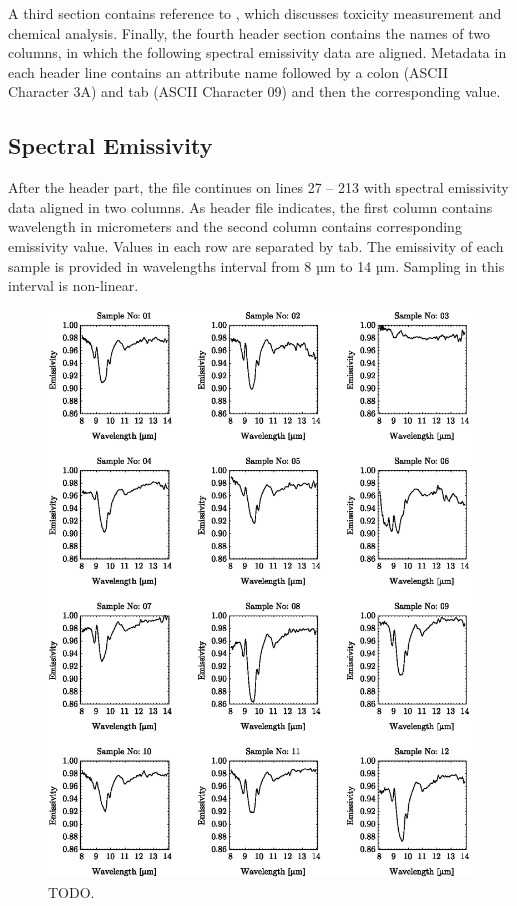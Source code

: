 \begin{appendices}
A third section contains reference to \cite{FK05}, which discusses toxicity measurement and chemical analysis. Finally, the fourth header section contains the names of two columns, in which the following spectral emissivity data are aligned. Metadata in each header line contains an attribute name followed by a colon (ASCII Character 3A) and tab (ASCII Character 09) and then the corresponding value.

\subsection{Spectral Emissivity}

After the header part, the file continues on lines 27 – 213 with spectral emissivity data aligned in two columns. As header file indicates, the first column contains wavelength in micrometers and the second column contains corresponding emissivity value. Values in each row are separated by tab. The emissivity of each sample is provided in wavelengths interval from 8 µm to 14 µm. Sampling in this interval is non-linear.

\begin{figure}[!t]
\centering
\includegraphics[width=0.95\linewidth]{pics/Chapter_05/spectral_library_pt1.eps}
\vspace{1.5 em}
\caption{TODO.}
\label{fig:SpoilSubstratesPreviewPt1}
\end{figure}


\end{appendices}
